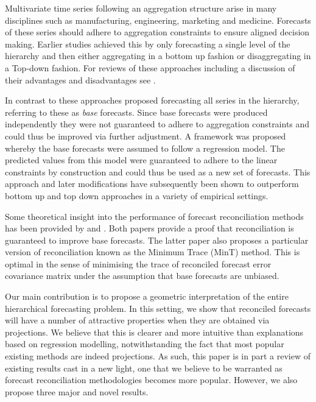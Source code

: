\documentclass[12pt]{article}
\theoremstyle{definition}
\theoremstyle{property}
\begin{document}
	Multivariate time series following an aggregation structure arise in many disciplines such as manufacturing, engineering, marketing and medicine. Forecasts of these series should adhere to aggregation constraints to ensure aligned decision making. Earlier studies achieved this by only forecasting a single level of the hierarchy and then either aggregating in a bottom up fashion \citep{Dunn1976} or disaggregating in a Top-down \citep{Gross1990, Athanasopoulos2009} fashion.  For reviews of these approaches including a discussion of their advantages and disadvantages see \citet{Schwarzkopf1988, Kahn1998, Lapide1998, Fliedner2001}. 
	
	In contrast to these approaches \cite{Hyndman2011} proposed forecasting all series in the hierarchy, referring to these as {\em base} forecasts.  Since base forecasts were produced independently they were not guaranteed to adhere to aggregation constraints and could thus be improved via further adjustment.  A framework was proposed whereby the base forecasts were assumed to follow a regression model.  The predicted values from this model were guaranteed to adhere to the linear constraints by construction and could thus be used as a new set of forecasts.  This approach and later modifications have subsequently been shown to outperform bottom up and top down approaches in a variety of empirical settings. 
	
	Some theoretical insight into the performance of forecast reconciliation methods has been provided by \cite{VanErven2015a} and \cite{WicEtAl2019}.  Both papers provide a proof that reconciliation is guaranteed to improve base forecasts.  The latter paper also proposes a particular version of reconciliation known as the Minimum Trace (MinT) method.  This is optimal in the sense of minimising the trace of reconciled forecast error covariance matrix under the assumption that base forecasts are unbiased.
	
	Our main contribution is to propose a geometric interpretation of the entire hierarchical forecasting problem.  In this setting, we show that reconciled forecasts will have a number of attractive properties when they are obtained via projections.  We believe that this is clearer and more intuitive than explanations based on regression modelling, notwithstanding the fact that most popular existing methods are indeed projections.  As such, this paper is in part a review of existing results cast in a new light, one that we believe to be warranted as forecast reconciliation methodologies becomes more popular.  However, we also propose three major and novel results.
	
\end{document}
